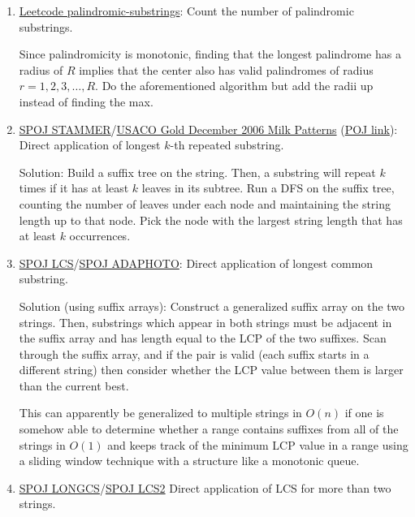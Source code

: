 \documentclass[11pt, oneside]{article}
\begin{document}
\begin{enumerate}
  \item \href{https://leetcode.com/problems/palindromic-substrings/}{Leetcode palindromic-substrings}: Count the number of palindromic substrings.

  Since palindromicity is monotonic, finding that the longest palindrome has a radius of
  \( R \) implies that the center also has valid palindromes of radius \( r = 1, 2, 3, \dots, R \).
  Do the aforementioned algorithm but add the radii up instead of finding the max.

  \item \href{https://www.spoj.com/problems/STAMMER/}{SPOJ STAMMER}/\href{https://contest.usaco.org/DEC06.htm}{USACO Gold December 2006 Milk Patterns} (\href{http://poj.org/problem?id=3261}{POJ link}): \\ Direct application of longest \( k \)-th repeated substring.

  Solution: Build a suffix tree on the string. Then, a substring will repeat \( k \) times
  if it has at least \( k \) leaves in its subtree. Run a DFS on the suffix tree, counting
  the number of leaves under each node and maintaining the string length up to that node.
  Pick the node with the largest string length that has at least \( k \) occurrences.

  \item \href{https://www.spoj.com/problems/LCS/}{SPOJ LCS}/\href{http://www.spoj.com/problems/ADAPHOTO/}{SPOJ ADAPHOTO}:
  Direct application of longest common substring.

  Solution (using suffix arrays): Construct a generalized suffix array on the two strings.
  Then, substrings which appear in both strings must be adjacent in the suffix array and
  has length equal to the LCP of the two suffixes.
  Scan through the suffix array, and if the pair is valid (each suffix starts in a different string)
  then consider whether the LCP value between them is larger than the current best.

  This can apparently be generalized to multiple strings in \( O(n) \)
  if one is somehow able to determine whether a range contains suffixes from all of the strings in \( O(1) \)
  and keeps track of the minimum LCP value in a range using a sliding window technique with a structure like a monotonic queue.

  \item \href{https://www.spoj.com/problems/LONGCS/}{SPOJ LONGCS}/\href{http://www.spoj.com/problems/LCS2/}{SPOJ LCS2}
  Direct application of LCS for more than two strings.


\end{enumerate}
\end{document}

